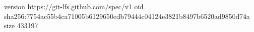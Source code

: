 version https://git-lfs.github.com/spec/v1
oid sha256:7754ac55b4ca71005b6129650edb79444c04124e3821b8497b6520ad9850d74a
size 433197
